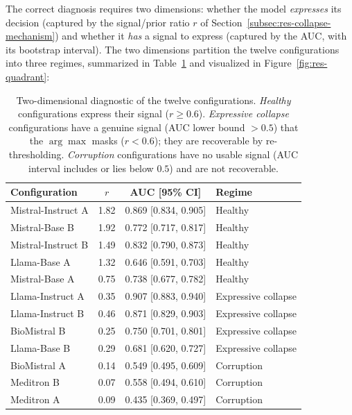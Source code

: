 The correct diagnosis requires two dimensions: whether the model 
\emph{expresses} its decision (captured by the signal/prior ratio $r$ of 
Section~\ref{subsec:res-collapse-mechanism}) and whether it \emph{has} a 
signal to express (captured by the AUC, with its bootstrap interval). The 
two dimensions partition the twelve configurations into three regimes, 
summarized in Table~\ref{tab:res-diagnostic} and visualized in 
Figure~\ref{fig:res-quadrant}:

\begin{table}[htbp]
    \centering
    \caption{Two-dimensional diagnostic of the twelve configurations. 
        \emph{Healthy} configurations express their signal ($r \geq 0.6$). 
        \emph{Expressive collapse} configurations have a genuine signal 
        (AUC lower bound $>0.5$) that the $\arg\max$ masks ($r < 0.6$); 
        they are recoverable by re-thresholding. \emph{Corruption} 
        configurations have no usable signal (AUC interval includes or 
        lies below $0.5$) and are not recoverable.}
    \label{tab:res-diagnostic}
    \small
    \begin{tabular}{@{}lccl@{}}
        \toprule
        \textbf{Configuration} & 
        \boldmath$r$ & 
        \textbf{AUC [95\% CI]} & 
        \textbf{Regime} \\
        \midrule
        Mistral-Instruct A & 1.82 & 0.869 [0.834, 0.905] & Healthy \\
        Mistral-Base B     & 1.92 & 0.772 [0.717, 0.817] & Healthy \\
        Mistral-Instruct B & 1.49 & 0.832 [0.790, 0.873] & Healthy \\
        Llama-Base A       & 1.32 & 0.646 [0.591, 0.703] & Healthy \\
        Mistral-Base A     & 0.75 & 0.738 [0.677, 0.782] & Healthy \\
        \midrule
        Llama-Instruct A & 0.35 & 0.907 [0.883, 0.940] & Expressive collapse \\
        Llama-Instruct B & 0.46 & 0.871 [0.829, 0.903] & Expressive collapse \\
        BioMistral B     & 0.25 & 0.750 [0.701, 0.801] & Expressive collapse \\
        Llama-Base B     & 0.29 & 0.681 [0.620, 0.727] & Expressive collapse \\
        \midrule
        BioMistral A & 0.14 & 0.549 [0.495, 0.609] & Corruption \\
        Meditron B   & 0.07 & 0.558 [0.494, 0.610] & Corruption \\
        Meditron A   & 0.09 & 0.435 [0.369, 0.497] & Corruption \\
        \bottomrule
    \end{tabular}
\end{table}

